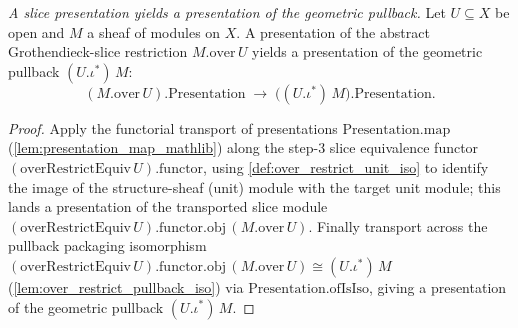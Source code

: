 \begin{definition}
  \label{def:over_restrict_presentation}
  \textit{A slice presentation yields a presentation of the geometric pullback.}
  Let \(U \subseteq X\) be open and \(M\) a sheaf of modules on \(X\). A
  presentation of the abstract Grothendieck-slice restriction \(M.\mathrm{over}\,U\)
  yields a presentation of the geometric pullback \((U.\iota^{*})\,M\):
  \[
    (M.\mathrm{over}\,U).\mathrm{Presentation}
      \;\longrightarrow\;
    \bigl((U.\iota^{*})\,M\bigr).\mathrm{Presentation} .
  \]
\end{definition}
\begin{proof}
  Apply the functorial transport of presentations \(\mathrm{Presentation.map}\)
  (\cref{lem:presentation_map_mathlib}) along the step-3 slice equivalence functor
  \((\mathrm{overRestrictEquiv}\,U).\mathrm{functor}\), using
  \cref{def:over_restrict_unit_iso} to identify the image of the structure-sheaf
  (unit) module with the target unit module; this lands a presentation of the
  transported slice module
  \((\mathrm{overRestrictEquiv}\,U).\mathrm{functor}.\mathrm{obj}\,(M.\mathrm{over}\,U)\).
  Finally transport across the pullback packaging isomorphism
  \((\mathrm{overRestrictEquiv}\,U).\mathrm{functor}.\mathrm{obj}\,(M.\mathrm{over}\,U)
  \cong (U.\iota^{*})\,M\) (\cref{lem:over_restrict_pullback_iso}) via
  \(\mathrm{Presentation.ofIsIso}\), giving a presentation of the geometric
  pullback \((U.\iota^{*})\,M\).
\end{proof}

